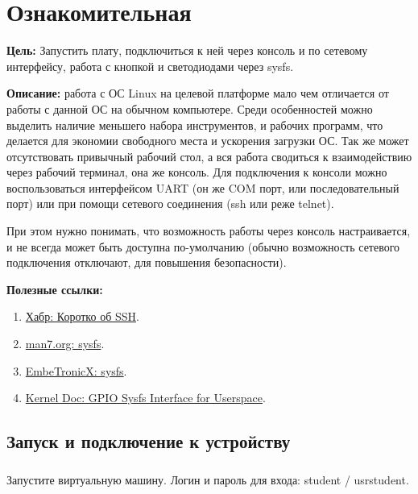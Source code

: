 \chapter{Ознакомительная}
\textbf{Цель:} Запустить плату, подключиться к ней через консоль и по сетевому интерфейсу, работа с кнопкой и светодиодами через sysfs.

\vspace{5mm}
\textbf{Описание:} работа с ОС Linux на целевой платформе мало чем отличается от работы с данной ОС на обычном компьютере. Среди особенностей можно выделить наличие меньшего набора инструментов, и рабочих программ, что делается для экономии свободного места и ускорения загрузки ОС. Так же может отсутствовать привычный рабочий стол, а вся работа сводиться к взаимодействию через рабочий терминал, она же консоль. Для подключения к консоли можно воспользоваться интерфейсом UART (он же COM порт, или последовательный порт) или при помощи сетевого соединения (ssh или реже telnet). 

При этом нужно понимать, что возможность работы через консоль настраивается, и не всегда может быть доступна по-умолчанию (обычно возможность сетевого подключения отключают, для повышения безопасности). 

\vspace{5mm}
\textbf{Полезные ссылки:}
\begin{enumerate}
	\item \href{https://habr.com/ru/sandbox/166705/}{Хабр: Коротко об SSH}.
	\item \href{https://man7.org/linux/man-pages/man5/sysfs.5.html}{man7.org: sysfs}.
	\item \href{https://embetronicx.com/tutorials/linux/device-drivers/sysfs-in-linux-kernel/}{EmbeTronicX: sysfs}.
	\item \href{https://www.kernel.org/doc/Documentation/gpio/sysfs.txt}{Kernel Doc: GPIO Sysfs Interface for Userspace}.	
\end{enumerate}

\section{Запуск и подключение к устройству}

\subsection{}Запустите виртуальную машину. Логин и пароль для входа: student / usrstudent.

